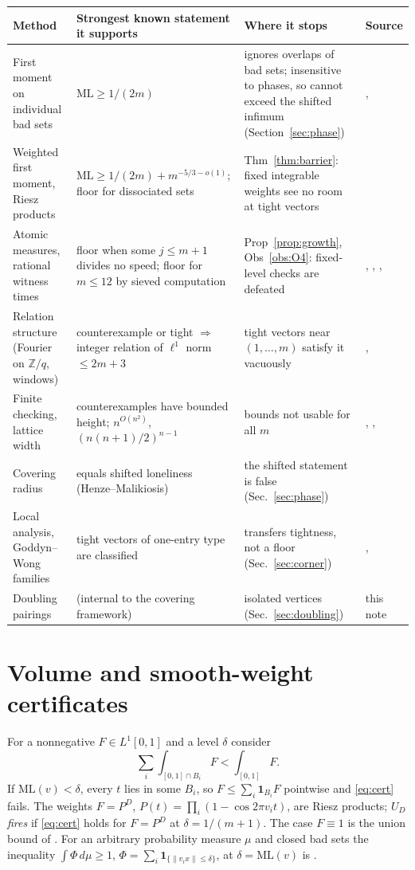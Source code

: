 \documentclass[11pt]{article}
\theoremstyle{remark}
\newcommand{\norm}[1]{\lVert #1\rVert}
\newcommand{\ML}{\mathrm{ML}}
\newcommand{\Z}{\mathbb{Z}}
\begin{document}
\begin{center}\footnotesize
\begin{tabular}{@{}p{2.6cm}p{4.1cm}p{4.3cm}p{1.6cm}@{}}
\toprule
Method & Strongest known statement it supports & Where it stops & Source\\
\midrule
First moment on individual bad sets & $\ML\ge1/(2m)$ & ignores overlaps of bad sets; insensitive to phases, so cannot exceed the shifted infimum (Section~\ref{sec:phase}) & \cite{Tao18}, \cite{PS25}\\
Weighted first moment, Riesz products & $\ML\ge 1/(2m)+m^{-5/3-o(1)}$; floor for dissociated sets & Thm~\ref{thm:barrier}: fixed integrable weights see no room at tight vectors & \cite{Bedert25}\\
Atomic measures, rational witness times & floor when some $j\le m+1$ divides no speed; floor for $m\le12$ by sieved computation & Prop~\ref{prop:growth}, Obs~\ref{obs:O4}: fixed-level checks are defeated & \cite{Tao18}, \cite{Rosenfeld25}, \cite{Trak26}, \cite{ST26}\\
Relation structure (Fourier on $\Z/q$, windows) & counterexample or tight $\Rightarrow$ integer relation of $\ell^1$ norm $\le2m+3$ & tight vectors near $(1,\dots,m)$ satisfy it vacuously & \cite{Cz12}, \cite{BE26}\\
Finite checking, lattice width & counterexamples have bounded height; $n^{O(n^2)}$, $(n(n+1)/2)^{n-1}$ & bounds not usable for all $m$ & \cite{Tao18}, \cite{MSS25}, \cite{GK25}\\
Covering radius & equals shifted loneliness (Henze--Malikiosis) & the shifted statement is false (Sec.~\ref{sec:phase}) & \cite{BCS26}\\
Local analysis, Goddyn--Wong families & tight vectors of one-entry type are classified & transfers tightness, not a floor (Sec.~\ref{sec:corner}) & \cite{GW06}, \cite{Zhang26}\\
Doubling pairings & (internal to the covering framework) & isolated vertices (Sec.~\ref{sec:doubling}) & this note\\
\bottomrule
\end{tabular}
\end{center}

\section{Volume and smooth-weight certificates}\label{sec:measure}

For a nonnegative $F\in L^1[0,1]$ and a level $\delta$ consider
\begin{equation}\label{eq:cert}
\sum_i\int_{[0,1]\cap B_i}F<\int_{[0,1]}F .
\end{equation}
If $\ML(v)<\delta$, every $t$ lies in some $B_i$, so $F\le\sum_i\mathbf 1_{B_i}F$ pointwise and \eqref{eq:cert} fails. The weights $F=P^D$, $P(t)=\prod_i(1-\cos2\pi v_it)$, are Riesz products; $U_D$ \emph{fires} if \eqref{eq:cert} holds for $F=P^D$ at $\delta=1/(m+1)$. The case $F\equiv1$ is the union bound of \cite[Prop.~1.1]{Tao18}. For an arbitrary probability measure $\mu$ and closed bad sets the inequality $\int\Phi\,d\mu\ge1$, $\Phi=\sum_i\mathbf 1_{\{\norm{v_i x}\le\delta\}}$, at $\delta=\ML(v)$ is \cite[Lemma~2.1]{Bedert25}.
\end{document}

